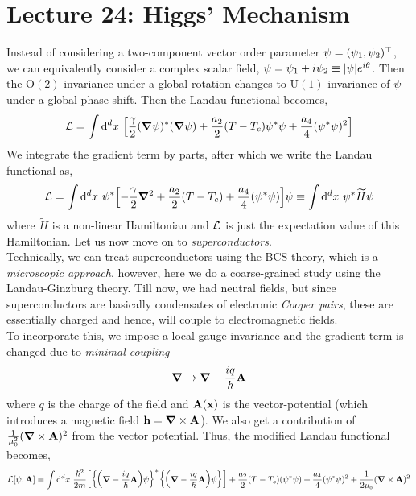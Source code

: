 \section*{Lecture 24: Higgs' Mechanism}
Instead of considering a two-component vector order parameter $\vb{\psi} = (\psi_1, \psi_2)^\top$, we can equivalently consider a complex scalar field, $\psi = \psi_1 + i \psi_2 \equiv \abs{\psi} e^{i\theta}$. Then the $\mathrm{O}(2)$ invariance under a global rotation changes to $\mathrm{U}(1)$ invariance of $\psi$ under a global phase shift. Then the Landau functional becomes,
\begin{equation}
    \mathcal L = \int \dd^d x \ \qty[\frac{\gamma}{2} (\grad \psi)^* (\grad \psi) + \frac{a_2}{2}(T-T_c) \psi^* \psi + \frac{a_4}{4}(\psi^* \psi)^2]
\end{equation}
We integrate the gradient term by parts, after which we write the Landau functional as, 
$$\mathcal L = \int \dd^d x \ \psi^* \qty[-\frac{\gamma}{2} \grad ^2  + \frac{a_2}{2}(T-T_c)  + \frac{a_4}{4}(\psi^* \psi)]\psi \equiv \int \dd^d x \ \psi^* \widetilde{H}\psi$$
where $\widetilde{H}$ is a non-linear Hamiltonian and $\mathcal L$ is just the expectation value of this Hamiltonian. Let us now move on to \textit{superconductors}.\\[0.2cm] Technically, we can treat superconductors using the BCS theory, which is a \textit{microscopic approach}, however, here we do a coarse-grained study using the Landau-Ginzburg theory. Till now, we had neutral fields, but since superconductors are basically condensates of electronic \textit{Cooper pairs}, these are essentially charged and hence, will couple to electromagnetic fields.\\[0.2cm] To incorporate this, we impose a local gauge invariance and the gradient term is changed due to \textit{minimal coupling}
$$\grad \to \grad - \frac{iq}{\hbar} \vb{A}$$
where $q$ is the charge of the field and $\vb{A}(\vb{x})$ is the vector-potential (which introduces a magnetic field $\vb{h} = \grad\times \vb{A}$). We also get a contribution of $\frac{1}{\mu_{\text{\tiny 0}}^2}(\grad\times \vb{A})^2$ from the vector potential. Thus, the modified Landau functional becomes,
\begin{equation}
    \mathcal L[\psi, \vb{A}] = \int \dd^d x\ \frac{\hbar^2}{2m} \qty[\qty{\qty(\grad - \frac{iq}{\hbar}\vb{A})\psi}^*\qty{\qty(\grad - \frac{iq}{\hbar}\vb{A})\psi}]  + \frac{a_2}{2}(T-T_c)(\psi^* \psi)  + \frac{a_4}{4}(\psi^* \psi)^2+ \frac{1}{2\mu_{\text{\tiny 0}}}(\grad\times \vb{A})^2
\end{equation}
